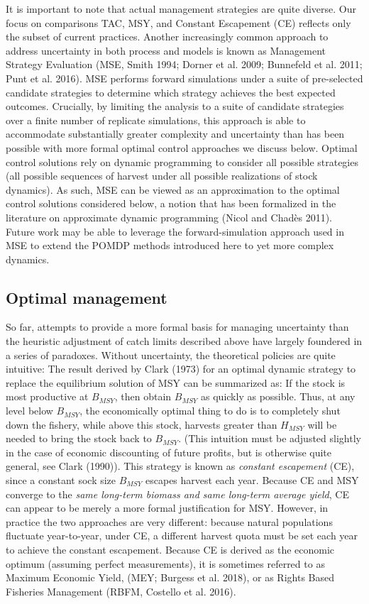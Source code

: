 \documentclass[3p]{elsarticle} %
\begin{document}
It is important to note that actual management strategies are quite
diverse. Our focus on comparisons TAC, MSY, and Constant Escapement (CE)
reflects only the subset of current practices. Another increasingly
common approach to address uncertainty in both process and models is
known as Management Strategy Evaluation (MSE, Smith 1994; Dorner et al.
2009; Bunnefeld et al. 2011; Punt et al. 2016). MSE performs forward
simulations under a suite of pre-selected candidate strategies to
determine which strategy achieves the best expected outcomes. Crucially,
by limiting the analysis to a suite of candidate strategies over a
finite number of replicate simulations, this approach is able to
accommodate substantially greater complexity and uncertainty than has
been possible with more formal optimal control approaches we discuss
below. Optimal control solutions rely on dynamic programming to consider
all possible strategies (all possible sequences of harvest under all
possible realizations of stock dynamics). As such, MSE can be viewed as
an approximation to the optimal control solutions considered below, a
notion that has been formalized in the literature on approximate dynamic
programming (Nicol and Chadès 2011). Future work may be able to leverage
the forward-simulation approach used in MSE to extend the POMDP methods
introduced here to yet more complex dynamics.

\hypertarget{optimal-management}{%
\subsection{Optimal management}\label{optimal-management}}

So far, attempts to provide a more formal basis for managing uncertainty
than the heuristic adjustment of catch limits described above have
largely foundered in a series of paradoxes. Without uncertainty, the
theoretical policies are quite intuitive: The result derived by Clark
(1973) for an optimal dynamic strategy to replace the equilibrium
solution of MSY can be summarized as: If the stock is most productive at
\(B_{MSY}\), then obtain \(B_{MSY}\) as quickly as possible. Thus, at
any level below \(B_{MSY}\), the economically optimal thing to do is to
completely shut down the fishery, while above this stock, harvests
greater than \(H_{MSY}\) will be needed to bring the stock back to
\(B_{MSY}\). (This intuition must be adjusted slightly in the case of
economic discounting of future profits, but is otherwise quite general,
see Clark (1990)). This strategy is known as \emph{constant escapement}
(CE), since a constant sock size \(B_{MSY}\) escapes harvest each year.
Because CE and MSY converge to the \emph{same long-term biomass and same
long-term average yield}, CE can appear to be merely a more formal
justification for MSY. However, in practice the two approaches are very
different: because natural populations fluctuate year-to-year, under CE,
a different harvest quota must be set each year to achieve the constant
escapement. Because CE is derived as the economic optimum (assuming
perfect measurements), it is sometimes referred to as Maximum Economic
Yield, (MEY; Burgess et al. 2018), or as Rights Based Fisheries
Management (RBFM, Costello et al. 2016).
\end{document}
